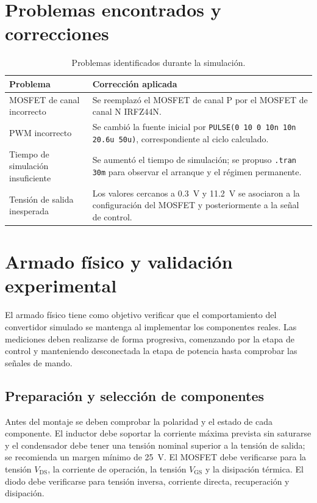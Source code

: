 \documentclass[12pt]{article}
\begin{document}
\section{Problemas encontrados y correcciones}
\begin{table}[H]
\centering
\caption{Problemas identificados durante la simulación.}
\label{tab:problemas}
\begin{tabular}{p{4.2cm}p{8.5cm}}
\toprule
\textbf{Problema} & \textbf{Corrección aplicada}\\
\midrule
MOSFET de canal incorrecto & Se reemplazó el MOSFET de canal P por el MOSFET de canal N IRFZ44N.\\
PWM incorrecto & Se cambió la fuente inicial por \texttt{PULSE(0 10 0 10n 10n 20.6u 50u)}, correspondiente al ciclo calculado.\\
Tiempo de simulación insuficiente & Se aumentó el tiempo de simulación; se propuso \texttt{.tran 30m} para observar el arranque y el régimen permanente.\\
Tensión de salida inesperada & Los valores cercanos a \SI{0.3}{V} y \SI{11.2}{V} se asociaron a la configuración del MOSFET y posteriormente a la señal de control.\\
\bottomrule
\end{tabular}
\end{table}

\section{Armado físico y validación experimental}
El armado físico tiene como objetivo verificar que el comportamiento del convertidor simulado se mantenga al implementar los componentes reales. Las mediciones deben realizarse de forma progresiva, comenzando por la etapa de control y manteniendo desconectada la etapa de potencia hasta comprobar las señales de mando.

\subsection{Preparación y selección de componentes}
Antes del montaje se deben comprobar la polaridad y el estado de cada componente. El inductor debe soportar la corriente máxima prevista sin saturarse y el condensador debe tener una tensión nominal superior a la tensión de salida; se recomienda un margen mínimo de \SI{25}{V}. El MOSFET debe verificarse para la tensión $V_{\mathrm{DS}}$, la corriente de operación, la tensión $V_{\mathrm{GS}}$ y la disipación térmica. El diodo debe verificarse para tensión inversa, corriente directa, recuperación y disipación.
\end{document}
